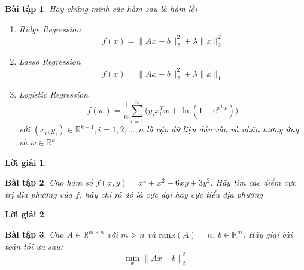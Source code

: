 \documentclass[14pt, a4paper]{article}
\theoremstyle{sltheorem}
\newtheorem{baitap}{Bài tập}
\newtheorem*{loigiai}{Lời giải}
\begin{document}
    \nocite{*}

    \begin{baitap}
        Hãy chứng minh các hàm sau là hàm lồi

        \begin{enumerate}[wide, labelwidth=!, labelindent=0pt,label=\textbf{\arabic*}.]
            \item Ridge Regression
            \begin{equation*}
                f(x)=\lVert Ax - b \rVert_2^2 + \lambda \lVert x \rVert_2^2
            \end{equation*}
            \item Lasso Regression
            \begin{equation*}
                f(x)=\lVert Ax - b \rVert_2^2 + \lambda \lVert x \rVert_1
            \end{equation*}
            \item Logistic Regression
            \begin{equation*}
                f(w)=\dfrac{1}{n}\sum_{i=1}^n \Big( y_i x_i^T w + \ln(1 + e^{x_i^T w}) \Big)
            \end{equation*}
            với $(x_i, y_i) \in \mathbb{R}^{k+1},i=1,2,\dots,n$ là cặp dữ liệu đầu vào và nhãn tương ứng và $w \in \mathbb{R}^k$
        \end{enumerate}
    \end{baitap}

    \begin{loigiai}
        
    \end{loigiai}

    \begin{baitap}
        Cho hàm số $f(x, y) = x^4 + x^2 - 6xy + 3y^2$. Hãy tìm các điểm cực trị địa phương của $f$, hãy chỉ rõ đó là cực đại hay cực tiểu địa phương
    \end{baitap}

    \begin{loigiai}
    \end{loigiai}

    \begin{baitap}
        Cho $A \in \mathbb{R}^{m \times n}$ với $m > n$ và $\mathrm{rank}(A)=n$, $b \in \mathbb{R}^{m}$. Hãy giải bài toán tối ưu sau:
        \begin{equation*}
            \min_x \lVert Ax - b \rVert_2^2
        \end{equation*}
    \end{baitap}
\end{document}
